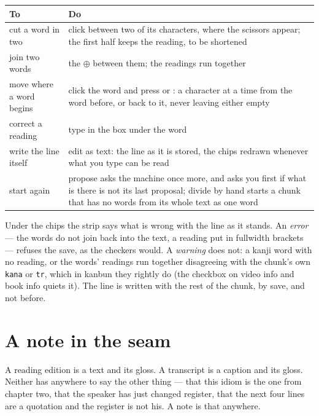 \documentclass[11pt,oneside]{report}
\newcommand{\key}[1]{\textsf{\small\fbox{#1}}}
\newcommand{\menu}[1]{\textsf{#1}}
\begin{document}
\begin{center}
\begin{tabular}{@{}p{}p{}@{}}
\toprule
\textsf{To} & \textsf{Do} \\
\midrule
cut a word in two & click between two of its characters, where the scissors
  appear; the first half keeps the reading, to be shortened \\
join two words & the \(\oplus\) between them; the readings run together \\
move where a word begins & click the word and press \key{$\leftarrow$} or
  \key{$\rightarrow$}: a character at a time from the word before, or back
  to it, never leaving either empty \\
correct a reading & type in the box under the word \\
write the line itself & \menu{edit as text}: the line as it is stored, the
  chips redrawn whenever what you type can be read \\
start again & \menu{propose} asks the machine once more, and asks you first
  if what is there is not its last proposal; \menu{divide by hand} starts a
  chunk that has no words from its whole text as one word \\
\bottomrule
\end{tabular}
\end{center}

Under the chips the strip says what is wrong with the line as it stands. An
\emph{error} --- the words do not join back into the text, a reading put in
fullwidth brackets --- refuses the save, as the checkers would. A
\emph{warning} does not: a kanji word with no reading, or the words' readings
run together disagreeing with the chunk's own \texttt{kana} or \texttt{tr},
which in kanbun they rightly do (the checkbox on \menu{video info} and
\menu{book info} quiets it). The line is written with the rest of the chunk,
by \menu{save}, and not before.

\section{A note in the seam}
\label{sec:notes}

A reading edition is a text and its gloss. A transcript is a caption and its
gloss. Neither has anywhere to say the other thing --- that this idiom is the
one from chapter two, that the speaker has just changed register, that the
next four lines are a quotation and the register is not his. A note is that
anywhere.
\end{document}
